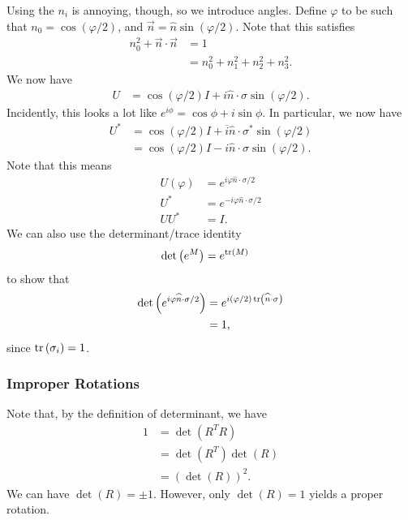 \documentclass[10pt]{mypackage}
\begin{document}
\begin{example}
  Using the $n_i$ is annoying, though, so we introduce angles. Define $\varphi$ to be such that $n_0 = \cos\left(\varphi/2\right)$, and $\vec{n} = \widehat{n}\sin\left(\varphi/2\right)$. Note that this satisfies
  \begin{align*}
    n_0^2 + \vec{n}\cdot \vec{n} &= 1\\
                                 &= n_0^2 + n_1^2 + n_2^2 + n_3^2.
  \end{align*}
  We now have
  \begin{align*}
    U &= \cos\left(\varphi/2\right)I + i\widehat{n}\cdot \sigma \sin\left(\varphi/2\right).
  \end{align*}
  Incidently, this looks a lot like $e^{i\phi} = \cos \phi + i\sin\phi$. In particular, we now have
  \begin{align*}
    U^{\ast} &= \cos\left(\varphi/2\right)I + \overline{i}\widehat{n}\cdot\sigma^{\ast}\sin\left(\varphi/2\right)\\
             &= \cos\left(\varphi/2\right) I - i\widehat{n}\cdot\sigma\sin\left(\varphi/2\right).
  \end{align*}
  Note that this means
  \begin{align*}
    U\left(\varphi\right) &= e^{i\varphi \widehat{n}\cdot \sigma/2}\\
    U^{\ast} &= e^{-i\varphi\widehat{n}\cdot\sigma/2}\\
    UU^{\ast} &= I.
  \end{align*}
  We can also use the determinant/trace identity
  \begin{align*}
    \det\left(e^{M}\right) &= e^{\tr(M)}
  \end{align*}
  to show that
  \begin{align*}
    \det\left(e^{i\varphi \widehat{n}\cdot \sigma/2}\right) &= e^{i\left(\varphi/2\right)\tr\left(\widehat{n}\cdot \sigma\right)}\\
                                                        &= 1,
  \end{align*}
  since $\tr\left(\sigma_i\right) = 1$.
\end{example}
\subsubsection{Improper Rotations}%
Note that, by the definition of determinant, we have
\begin{align*}
  1 &= \det\left(R^{T}R\right)\\
    &= \det\left(R^{T}\right)\det\left(R\right)\\
    &= \left(\det\left(R\right)\right)^2.
\end{align*}
We can have $\det(R) = \pm 1$. However, only $\det(R) = 1$ yields a proper rotation.\newline
\end{document}
